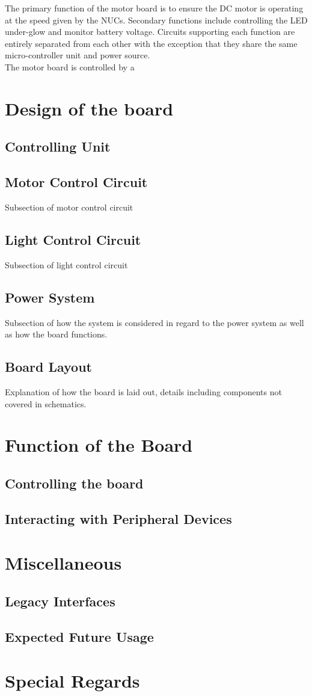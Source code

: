 \documentclass[letterpaper, 12pt]{article}
\begin{document}
The primary function of the motor board is to ensure the DC motor is operating at the speed given by the NUCs. Secondary functions include controlling the LED under-glow and monitor battery voltage. Circuits supporting each function are entirely separated from each other with the exception that they share the same micro-controller unit and power source.\vspace{6pt}\\
The motor board is controlled by a 

\section{Design of the board}
\subsection{Controlling Unit}
\subsection{Motor Control Circuit}
Subsection of motor control circuit 
\pagebreak
\subsection{Light Control Circuit}
Subsection of light control circuit
\pagebreak
\subsection{Power System}
Subsection of how the system is considered in regard to the power system as well as how the board functions.
\pagebreak
\subsection{Board Layout}
Explanation of how the board is laid out, details including components not covered in schematics.
\pagebreak

\section{Function of the Board}
\subsection{Controlling the board}
\pagebreak
\subsection{Interacting with Peripheral Devices}
\pagebreak

\section{Miscellaneous}
\subsection{Legacy Interfaces}
\pagebreak
\subsection{Expected Future Usage}
\pagebreak

\section{Special Regards}
\pagebreak
\end{document}
